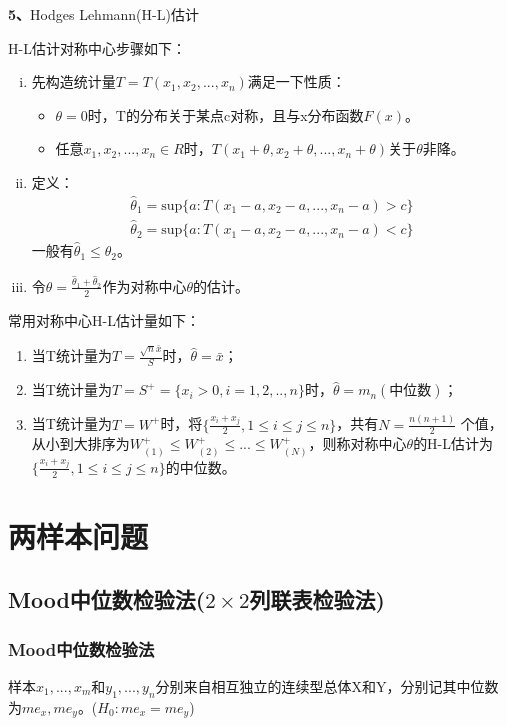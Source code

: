 \documentclass[lang=cn,10pt]{elegantbook}
\begin{document}
\textbf{5、}Hodges Lehmann(H-L)估计

H-L估计对称中心步骤如下：
\begin{enumerate}[(i)]
    \item 先构造统计量$T = T(x_1,x_2,...,x_n)$满足一下性质：
          \begin{itemize}
              \item $\theta = 0$时，T的分布关于某点c对称，且与x分布函数$F(x)$。
              \item 任意$x_1,x_2,...,x_n\in R$时，$T(x_1+\theta,x_2+\theta,...,x_n+\theta)$关于$\theta$非降。
          \end{itemize}
    \item 定义：
          \begin{equation}
              \begin{aligned}
                  \hat{\theta}_1 = \mathrm{sup}\{a:T(x_1-a,x_2-a,...,x_n-a)>c\} \\
                  \hat{\theta}_2 = \mathrm{sup}\{a:T(x_1-a,x_2-a,...,x_n-a)<c\}
              \end{aligned}
          \end{equation}
          一般有$\hat{\theta}_1 \leq\hat{\theta}_2$。
    \item 令$\theta = \frac{\hat{\theta}_1+\hat{\theta}_2}2$作为对称中心$\theta$的估计。
\end{enumerate}
常用对称中心H-L估计量如下：
\begin{enumerate}[(1)]
    \item 当T统计量为$T = \frac{\sqrt{n}\bar{x}}{S}$时，$\hat{\theta} = \bar{x}$；
    \item 当T统计量为$T = S^+= \{x_i>0,i = 1,2,..,n\}$时，$\hat{\theta} = m_n(\text{中位数})$；
    \item 当T统计量为$T = W^+$时，将$\{\frac{x_i+x_j}{2},1\leq i\leq j\leq n\}$，共有$N = \frac{n(n+1)}{2}$
          个值，从小到大排序为$W_{(1)}^+\leq W_{(2)}^+\leq...\leq W_{(N)}^+$，则称对称中心$\theta$的H-L估计为
          $\{\frac{x_i+x_j}{2},1\leq i\leq j\leq n\}$的中位数。
\end{enumerate}

\chapter{两样本问题}
\section{Mood中位数检验法($2\times 2$列联表检验法)}
\subsection{Mood中位数检验法}
样本$x_1,...,x_m$和$y_1,...,y_n$分别来自相互独立的连续型总体X和Y，分别记其中位数
为$me_x,me_y$。($H_0:me_x = me_y$)
\end{document}
